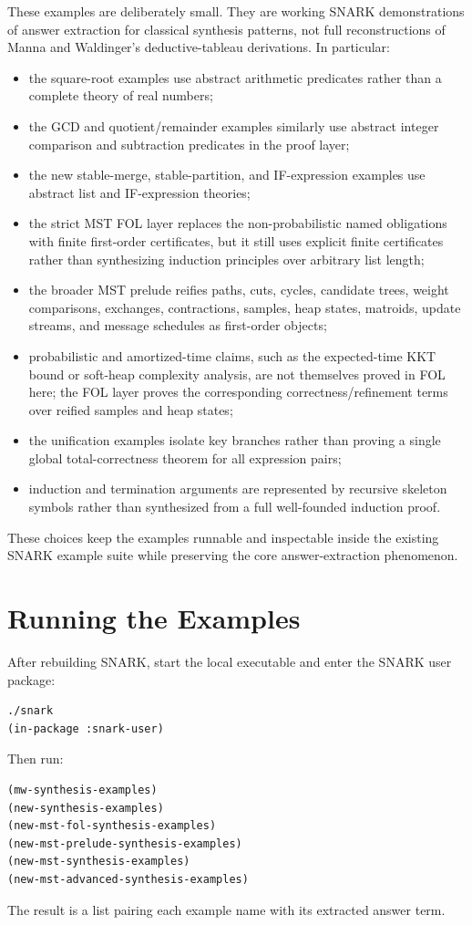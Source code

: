 \documentclass[runningheads]{llncs}
\begin{document}
These examples are deliberately small.  They are working SNARK demonstrations
of answer extraction for classical synthesis patterns, not full reconstructions
of Manna and Waldinger's deductive-tableau derivations.  In particular:
\begin{itemize}
\item the square-root examples use abstract arithmetic predicates rather than a
complete theory of real numbers;
\item the GCD and quotient/remainder examples similarly use abstract integer
comparison and subtraction predicates in the proof layer;
\item the new stable-merge, stable-partition, and IF-expression examples use
abstract list and IF-expression theories;
\item the strict MST FOL layer replaces the non-probabilistic named
obligations with finite first-order certificates, but it still uses explicit
finite certificates rather than synthesizing induction principles over
arbitrary list length;
\item the broader MST prelude reifies paths, cuts, cycles, candidate trees,
weight comparisons, exchanges, contractions, samples, heap states, matroids,
update streams, and message schedules as first-order objects;
\item probabilistic and amortized-time claims, such as the expected-time KKT
bound or soft-heap complexity analysis, are not themselves proved in FOL here;
the FOL layer proves the corresponding correctness/refinement terms over
reified samples and heap states;
\item the unification examples isolate key branches rather than proving a
single global total-correctness theorem for all expression pairs;
\item induction and termination arguments are represented by recursive
skeleton symbols rather than synthesized from a full well-founded induction
proof.
\end{itemize}
These choices keep the examples runnable and inspectable inside the existing
SNARK example suite while preserving the core answer-extraction phenomenon.

\section{Running the Examples}

After rebuilding SNARK, start the local executable and enter the SNARK user
package:
\begin{lstlisting}
./snark
(in-package :snark-user)
\end{lstlisting}
Then run:
\begin{lstlisting}
(mw-synthesis-examples)
(new-synthesis-examples)
(new-mst-fol-synthesis-examples)
(new-mst-prelude-synthesis-examples)
(new-mst-synthesis-examples)
(new-mst-advanced-synthesis-examples)
\end{lstlisting}
The result is a list pairing each example name with its extracted answer term.
\end{document}
